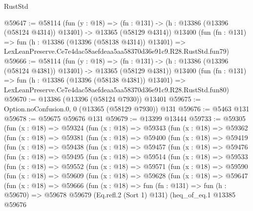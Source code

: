 \begin{lexlean}{RustStd}
\begin{coremodule}
@59647 := @58114
    (fun (y : @18) =>
    (fn : @131) -> (h : @13386 (@13396 (@58124 @4314)) @13401) -> @13365 (@58129 @4314))
    @13400
    (fun (fn : @131) =>
    fun (h : @13386 (@13396 (@58138 @4314)) @13401) =>
    LexLeanPreserve.Ce7e4dac58aefdeaa5aa58370d36e91c9.R28.RustStd.fun79)
@59666 := @58114
    (fun (y : @18) =>
    (fn : @131) -> (h : @13386 (@13396 (@58124 @4381)) @13401) -> @13365 (@58129 @4381))
    @13400
    (fun (fn : @131) =>
    fun (h : @13386 (@13396 (@58138 @4381)) @13401) =>
    LexLeanPreserve.Ce7e4dac58aefdeaa5aa58370d36e91c9.R28.RustStd.fun80)
@59670 := @13386 (@13396 (@58124 @7930)) @13401
@59675 := Option.noConfusion.{0, 0} (@13365 (@58129 @7930)) @131
@59676 := @5463 @131
@59678 := @59675 @59676 @131
@59679 := @13399 @13444
@59733 := @59305
    (fun (x : @18) =>
    @59324
      (fun (x : @18) =>
      @59343
        (fun (x : @18) =>
        @59362
          (fun (x : @18) =>
          @59381
            (fun (x : @18) =>
            @59400
              (fun (x : @18) =>
              @59419
                (fun (x : @18) =>
                @59438
                  (fun (x : @18) =>
                  @59457
                    (fun (x : @18) =>
                    @59476
                      (fun (x : @18) =>
                      @59495
                        (fun (x : @18) =>
                        @59514
                          (fun (x : @18) =>
                          @59533
                            (fun (x : @18) =>
                            @59552
                              (fun (x : @18) =>
                              @59571
                                (fun (x : @18) =>
                                @59590
                                  (fun (x : @18) =>
                                  @59609
                                    (fun (x : @18) =>
                                    @59628
                                      (fun (x : @18) =>
                                      @59647
                                        (fun (x : @18) =>
                                        @59666
                                          (fun (x : @18) =>
                                          fun (fn : @131) =>
                                          fun (h : @59670) =>
                                          @59678
                                            @59679
                                            (Eq.refl.{2} (Sort 1) @131)
                                            (heq_of_eq.{1}
                                              @13385
                                              @59676

\end{coremodule}
\end{lexlean}
